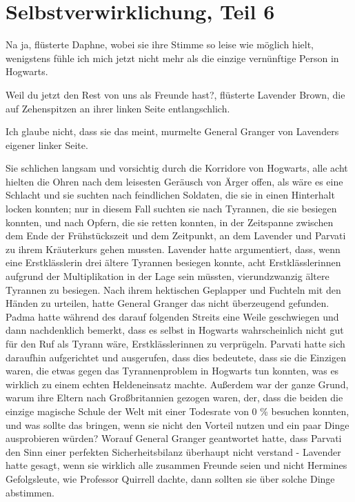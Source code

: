 \chapter{Selbstverwirklichung, Teil 6}

\glqq Na ja\grqq{}, flüsterte Daphne, wobei sie ihre Stimme so leise wie möglich
hielt, \glqq wenigstens fühle ich mich jetzt nicht mehr als die einzige
vernünftige Person in Hogwarts.\grqq{}

\glqq Weil du jetzt den Rest von uns als Freunde hast?\grqq{}, flüsterte
Lavender Brown, die auf Zehenspitzen an ihrer linken Seite entlangschlich.

\glqq Ich glaube nicht, dass sie das meint\grqq{}, murmelte General Granger von
Lavenders eigener linker Seite.

Sie schlichen langsam und vorsichtig durch die Korridore von Hogwarts, alle acht
hielten die Ohren nach dem leisesten Geräusch von Ärger offen, als wäre es eine
Schlacht und sie suchten nach feindlichen Soldaten, die sie in einen Hinterhalt
locken konnten; nur in diesem Fall suchten sie nach Tyrannen, die sie besiegen
konnten, und nach Opfern, die sie retten konnten, in der Zeitspanne zwischen dem
Ende der Frühstückszeit und dem Zeitpunkt, an dem Lavender und Parvati zu ihrem
Kräuterkurs gehen mussten. Lavender hatte argumentiert, dass, wenn eine
Erstklässlerin drei ältere Tyrannen besiegen konnte, acht Erstklässlerinnen
aufgrund der Multiplikation in der Lage sein müssten, vierundzwanzig ältere
Tyrannen zu besiegen. Nach ihrem hektischen Geplapper und Fuchteln mit den
Händen zu urteilen, hatte General Granger das nicht überzeugend gefunden. Padma
hatte während des darauf folgenden Streits eine Weile geschwiegen und dann
nachdenklich bemerkt, dass es selbst in Hogwarts wahrscheinlich nicht gut für
den Ruf als Tyrann wäre, Erstklässlerinnen zu verprügeln. Parvati hatte sich
daraufhin aufgerichtet und ausgerufen, dass dies bedeutete, dass sie die
Einzigen waren, die etwas gegen das Tyrannenproblem in Hogwarts tun konnten, was
es wirklich zu einem echten Heldeneinsatz machte. Außerdem war der ganze Grund,
warum ihre Eltern nach Großbritannien gezogen waren, der, dass die beiden die
einzige magische Schule der Welt mit einer Todesrate von 0 \% besuchen konnten,
und was sollte das bringen, wenn sie nicht den Vorteil nutzen und ein paar Dinge
ausprobieren würden? Worauf General Granger geantwortet hatte, dass Parvati den
Sinn einer perfekten Sicherheitsbilanz überhaupt nicht verstand - Lavender hatte
gesagt, wenn sie wirklich alle zusammen Freunde seien und nicht Hermines
Gefolgsleute, wie Professor Quirrell dachte, dann sollten sie über solche Dinge
abstimmen.

